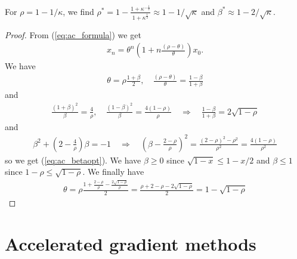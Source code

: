 \documentclass[english,12pt,a4paper]{article}
\begin{document}
%
\begin{remark}\label{rmk:}
For $\rho = 1 -1/\kappa$, we find $\rho^* = 1 - \frac{1+\kappa^{-\frac12}}{1+\kappa^{\frac12}} \approx 1 -1/\sqrt{\kappa}$ and $\beta^*\approx 1-2/\sqrt{\kappa}$.
\end{remark}
%
\begin{proof}
%
From (\ref{eq:ac_formula}) we get
\begin{align*}
x_{n} = \theta^n\left( 1 + n\frac{(\rho-\theta)}{\theta}\right)x_0.
\end{align*}
%
We have 
%
\begin{align*}
\theta = \rho\frac{1+\beta}{2}, \quad \frac{(\rho-\theta)}{\theta} = \frac{1-\beta}{1+\beta}
\end{align*}
%
and
%
\begin{align*}
\frac{(1+\beta)^2}{\beta} = \frac{4}{\rho},\quad \frac{(1-\beta)^2}{\beta} = \frac{4(1-\rho)}{\rho}
\quad\Rightarrow\quad  \frac{1-\beta}{1+\beta} = 2 \sqrt{1-\rho}
\end{align*}
%
and
%
\begin{align*}
\beta^2 + (2-\frac{4}{\rho})\beta = -1\quad\Rightarrow\quad \left(\beta - \frac{2-\rho}{\rho}\right)^2
=  \frac{(2-\rho)^2-\rho^2}{\rho^2}=  \frac{4(1-\rho)}{\rho^2}
\end{align*}
%
so we get (\ref{eq:ac_betaopt}). We have $\beta\ge0$ since $\sqrt{1-x}\le 1 - x/2$ and $\beta\le 1$ since $1-\rho \le \sqrt{1-\rho}$.
We finally have
%
\begin{align*}
\theta =  \rho\frac{1+\frac{2-\rho}{\rho} - \frac{2\sqrt{1-\rho}}{\rho}}{2}
=  \frac{\rho+2-\rho - 2\sqrt{1-\rho}}{2} = 1 - \sqrt{1-\rho}
\end{align*}
%




\end{proof}
%


%
%
\section{Accelerated gradient methods}\label{sec:}
%
%
\end{document}
